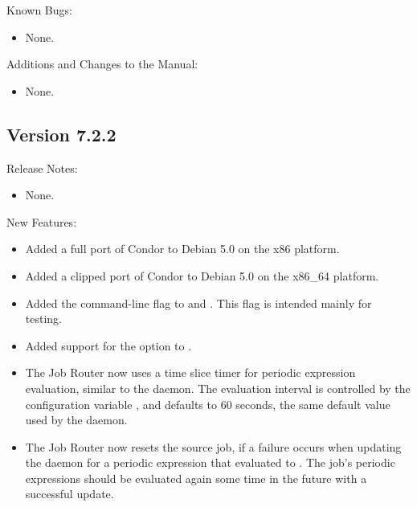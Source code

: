 \noindent Known Bugs:

\begin{itemize}

\item None.

\end{itemize}

\noindent Additions and Changes to the Manual:

\begin{itemize}

\item None.

\end{itemize}



\subsection*{\label{sec:New-7-2-2}Version 7.2.2}

\noindent Release Notes:

\begin{itemize}

\item None.

\end{itemize}


\noindent New Features:

\begin{itemize}

\item Added a full port of Condor to Debian 5.0 on the x86 platform.

\item Added a clipped port of Condor to Debian 5.0 on the x86\_64 platform.

\item Added the  command-line flag to 
and .  This flag is intended mainly for testing.

\item Added support for the  option to .

\item The Job Router now uses a time slice timer for periodic expression
  evaluation, similar to the  daemon.
  The evaluation interval is controlled by 
  the configuration variable ,
  and defaults to 60 seconds, the same default value used by
  the  daemon.

\item The Job Router now resets the source job, if a failure occurs when
  updating the  daemon for a periodic expression that
  evaluated to .  The job's periodic expressions should be
  evaluated again some time in the future with a successful update.

\end{itemize}

